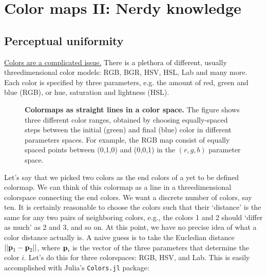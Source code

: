 \section{Color maps II: Nerdy knowledge}
\subsection{Perceptual uniformity}\label{sec:perceptualuniform}
\href{https://xkcd.com/1882/}{Colors are a complicated issue.} There is a plethora of different, usually threedimensional color models: RGB, BGR, HSV, HSL, Lab and many more. Each color is specified by three parameters, e.g. the amount of red, green and blue (RGB), or hue, saturation and lightness (HSL).   

\begin{figure}
\captionsetup{format = sidebyside, indention = 0cm} 
\begin{minipage}[t]{0.4\textwidth}
	\vspace{-5pt}
	\caption{\textbf{Colormaps as straight lines in a color space.} The figure shows three different color ranges, obtained by choosing equally-spaced steps between the initial (green) and final (blue) color in different parameters spaces. For example, the RGB map consist of equally spaced points between (0,1,0) and (0,0,1) in the $(r,g,b)$ parameter space.}
	\label{fig:colorspaces}
\end{minipage}\hfill 
\begin{minipage}[t]{0.55\textwidth}
	\centering 
	\vspace{0pt}
	
\end{minipage}
\end{figure} 

Let's say that we picked two colors as the end colors of a yet to be defined colormap. We can think of this colormap as a line in a threedimensional colorspace connecting the end colors. We want a discrete number of colors, say ten. It is certainly reasonable to choose the colors such that their `distance' is the same for any two pairs of neighboring colors, e.g., the colors 1 and 2 should `differ as much' as 2 and 3, and so on. At this point, we have no precise idea of what a color distance actually is. A naive guess is to take the Eucledian distance $||\textbf{p}_1-\textbf{p}_2||$, where $\textbf{p}_i$ is the vector of the three parameters that determine the color $i$.  Let's do this for three colorspaces: RGB, HSV, and Lab. This is easily accomplished with Julia's \verb|Colors.jl| package:

